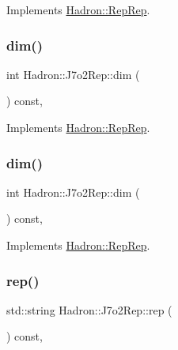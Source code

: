 Implements \mbox{\hyperlink{structHadron_1_1RepRep_a92c8802e5ed7afd7da43ccfd5b7cd92b}{Hadron\+::\+Rep\+Rep}}.

\mbox{\label{structHadron_1_1J7o2Rep_a0134ed51bb5cad59f0a552c5bc472765}} 
\subsubsection{\texorpdfstring{dim()}{dim()}\hspace{0.1cm}{\footnotesize\ttfamily [4/5]}}
{\footnotesize\ttfamily int Hadron\+::\+J7o2\+Rep\+::dim (\begin{DoxyParamCaption}{ }\end{DoxyParamCaption}) const\hspace{0.3cm}{\ttfamily [inline]}, {\ttfamily [virtual]}}



Implements \mbox{\hyperlink{structHadron_1_1RepRep_a92c8802e5ed7afd7da43ccfd5b7cd92b}{Hadron\+::\+Rep\+Rep}}.

\mbox{\label{structHadron_1_1J7o2Rep_a0134ed51bb5cad59f0a552c5bc472765}} 
\subsubsection{\texorpdfstring{dim()}{dim()}\hspace{0.1cm}{\footnotesize\ttfamily [5/5]}}
{\footnotesize\ttfamily int Hadron\+::\+J7o2\+Rep\+::dim (\begin{DoxyParamCaption}{ }\end{DoxyParamCaption}) const\hspace{0.3cm}{\ttfamily [inline]}, {\ttfamily [virtual]}}



Implements \mbox{\hyperlink{structHadron_1_1RepRep_a92c8802e5ed7afd7da43ccfd5b7cd92b}{Hadron\+::\+Rep\+Rep}}.

\mbox{\label{structHadron_1_1J7o2Rep_a7fe87890d8fa36768f1a09f929f26b9c}} 
\subsubsection{\texorpdfstring{rep()}{rep()}\hspace{0.1cm}{\footnotesize\ttfamily [1/5]}}
{\footnotesize\ttfamily std\+::string Hadron\+::\+J7o2\+Rep\+::rep (\begin{DoxyParamCaption}{ }\end{DoxyParamCaption}) const\hspace{0.3cm}{\ttfamily [inline]}, {\ttfamily [virtual]}}



